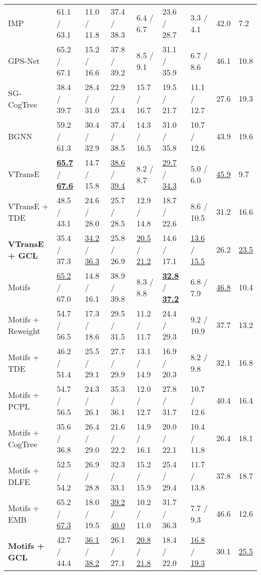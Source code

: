 \documentclass[10pt,twocolumn,letterpaper]{article}
\begin{document}
{\begin{table*}[t]
\begin{tabular}{p{3.2cm}|p{1.4cm}<{\centering}p{1.4cm}<{\centering}|p{1.4cm}<{\centering}p{1.4cm}<{\centering}|p{1.4cm}<{\centering}p{1.4cm}<{\centering}|p{0.5cm}<{\centering}p{0.5cm}}
		{IMP}  \cite{suhail2021energy}  & 61.1 / 63.1 & 11.0 / 11.8 & 37.4 / 38.3 & 6.4 / 6.7 & 23.6 / 28.7 & 3.3 / 4.1 & 42.0 & 7.2 \\ 
		{GPS-Net} \cite{li2021bipartite}  & 65.2 / 67.1 & 15.2 / 16.6 & 37.8 / 39.2 & 8.5 / 9.1 & 31.1 / 35.9 & 6.7 / 8.6 & 46.1 & 10.8 \\ 
		SG-CogTree \cite{yu2020cogtree} & 38.4 / 39.7 & 28.4 / 31.0 & 22.9 / 23.4 & 15.7 / 16.7 & 19.5 / 21.7 & 11.1 / 12.7 & 27.6 & 19.3\\ 
		BGNN \cite{li2021bipartite} & 59.2 / 61.3 & 30.4 / 32.9 & 37.4 / 38.5 & 14.3 / 16.5 & 31.0 / 35.8 & 10.7 / 12.6 & 43.9 & 19.6 \\ \hline
		VTransE \cite{tang2020unbiased} & \underline{\textbf{65.7}} / \underline{\textbf{67.6}} & 14.7 / 15.8 & \underline{38.6} / \underline{39.4} & 8.2 / 8.7 & \underline{29.7} / \underline{34.3} & 5.0 / 6.0 & \underline{45.9} & 9.7 \\
		VTransE + TDE \cite{tang2020unbiased} & 48.5 / 43.1 & 24.6 / 28.0 & 25.7 / 28.5 & 12.9 / 14.8 & 18.7 / 22.6 & 8.6 / 10.5 & 31.2 & 16.6 \\
		\textbf{VTransE + GCL} & 35.4 / 37.3 & \underline{34.2} / \underline{36.3} & 25.8 / 26.9 & \underline{20.5} / \underline{21.2} & 14.6 / 17.1 & \underline{13.6} / \underline{15.5} & 26.2 & \underline{23.5} \\\hline
		
		Motifs \cite{tang2020unbiased} &  \underline{65.2} / 67.0 & 14.8 / 16.1 & 38.9 / 39.8 & 8.3 / 8.8 & \underline{\textbf{32.8}} / \underline{\textbf{37.2}} & 6.8 / 7.9 & \underline{46.8} & 10.4 \\
		Motifs + Reweight \cite{chiou2021recovering} &  54.7 / 56.5 & 17.3 / 18.6 & 29.5 / 31.5 & 11.2 / 11.7 & 24.4 / 29.3 & 9.2 / 10.9 & 37.7 & 13.2 \\
		Motifs + TDE \cite{tang2020unbiased} & 46.2 / 51.4 & 25.5 / 29.1 & 27.7 / 29.9 & 13.1 / 14.9 & 16.9 / 20.3 & 8.2 / 9.8 & 32.1 & 16.8 \\
		Motifs + {PCPL} \cite{chiou2021recovering}  & 54.7 / 56.5 & 24.3 / 26.1 & 35.3 / 36.1 & 12.0 / 12.7 & 27.8 / 31.7 & 10.7 / 12.6 & 40.4 & 16.4 \\
		Motifs + CogTree \cite{yu2020cogtree} & 35.6 / 36.8 & 26.4 / 29.0 & 21.6 / 22.2 & 14.9 / 16.1 & 20.0 / 22.1 & 10.4 / 11.8 & 26.4 & 18.1 \\
		Motifs + DLFE \cite{chiou2021recovering} & 52.5 / 54.2 & 26.9 / 28.8 & 32.3 / 33.1 & 15.2 / 15.9 & 25.4 / 29.4 & 11.7 / 13.8 & 37.8 & 18.7 \\
		Motifs + EMB \cite{suhail2021energy} & 65.2 / \underline{67.3} & 18.0 / 19.5 & \underline{39.2} / \underline{40.0} & 10.2 / 11.0 & 31.7 / 36.3 & 7.7 / 9.3 & 46.6 & 12.6 \\
		\textbf{Motifs + GCL} & 42.7 / 44.4 & \underline{36.1} / \underline{38.2} & 26.1 / 27.1 & \underline{20.8} / \underline{21.8} & 18.4 / 22.0 & \underline{16.8} / \underline{19.3} & 30.1 & \underline{25.5} \\\hline
		

\end{tabular}
\end{table*}}
\end{document}
